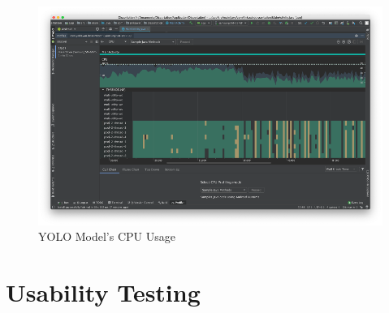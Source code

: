         \begin{figure}[!ht]
            \includegraphics[width=6in]{images/chapter5/YOLO/cpu-usage-8threads.png}
            \caption{YOLO Model's CPU Usage}
            \label{yolo:cpuUsage}
        \end{figure}

    \section{Usability Testing}